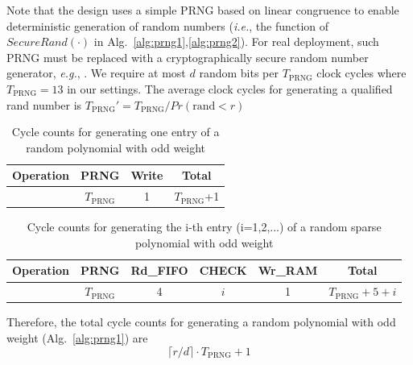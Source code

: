 \documentclass[runningheads]{llncs}
\begin{document}

Note that the design uses a simple PRNG based on linear congruence to enable deterministic generation of random numbers (\textit{i.e.}, the function of $SecureRand(\cdot)$ in Alg.~\ref{alg:prng1},\ref{alg:prng2}). For real deployment,
such PRNG must be replaced with a cryptographically secure random number
generator, \textit{e.g.}, \cite{laue2007compact,cherkaoui2013very}. We require at most $d$ random bits per $T_{\text{PRNG}}$ clock cycles where $T_{\text{PRNG}}=13$ in our settings.
The average clock cycles for generating a qualified rand number is $T_{\text{PRNG}}' = T_{\text{PRNG}}/Pr(\text{rand} < r)$

\begin{table}[!tb]\centering
\caption{Cycle counts for generating  one entry of a random polynomial with odd weight}
\begin{tabular}{c|c|c|c}
  \hline
  Operation & PRNG & Write & Total \\\hline
   & $T_{\text{PRNG}}$ & 1  & $T_{\text{PRNG}}$+1 \\
  \hline
\end{tabular}
\end{table}

\begin{table}[!tb]\centering
\caption{Cycle counts for generating  the i-th entry (i=1,2,...) of a random sparse polynomial with odd weight}
\begin{tabular}{c|c|c|c|c|c}
  \hline
  Operation & PRNG & Rd\_FIFO & CHECK &Wr\_RAM & Total \\\hline
   & $T_{\text{PRNG}}$ & 4  & $i$ & 1 &$T_{\text{PRNG}}+5+i$ \\
  \hline
\end{tabular}
\end{table}

Therefore, the total cycle counts for generating a random polynomial with odd weight (Alg.~\ref{alg:prng1}) are
\[
    \lceil r/d\rceil\cdot T_{\text{PRNG}} + 1
\]
\end{document}
